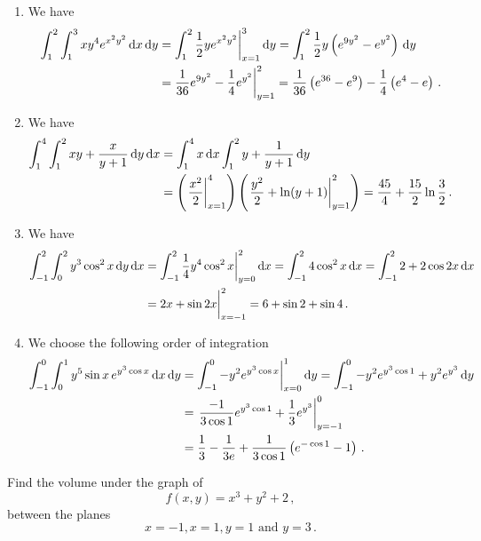 \begin{solution}
\begin{enumerate}
\item
We have
\begin{align*}
\int_1^2 \int_1^3 xy^4 e^{x^2y^2} \,\mathrm{d} x \,\mathrm{d} y
&= \int_1^2 \frac 12 y e^{x^2y^2} \bigg|_{x=1}^3 \,\mathrm{d} y
= \int_1^2 \frac 12 y \left( e^{9y^2} - e^{y^2}\right) \,\mathrm{d} y \\
&= \frac{1}{36} e^{9y^2} - \frac{1}{4} e^{y^2} \bigg|_{y=1}^2
= \frac{1}{36} \left(e^{36} - e^9\right) - \frac{1}{4} \left(e^4 - e\right)\,.
\end{align*}
\item We have
\begin{align*}
\int_1^4 \int_1^2 xy + \frac{x}{y+1} \,\mathrm{d} y \,\mathrm{d} x
&= \int_1^4 x \,\mathrm{d} x \int_1^2 y + \frac{1}{y+1} \,\mathrm{d} y \\
&= \left(\left. \frac{x^2}2 \right|_{x=1}^4 \right) \left(\left. \frac{y^2}2 + \ln(y+1) \right|_{y=1}^2 \right)
= \frac {45}4 + \frac{15}2 \ln \frac 32\,.
\end{align*}
\item
We have
\begin{align*}
\int_{-1}^2 \int_0^2 y^3 \cos^2 x \,\mathrm{d} y \,\mathrm{d} x &=
\int_{-1}^2 \frac 14 y^4 \cos^2 x \bigg|_{y=0}^2 \,\mathrm{d} x
= \int_{-1}^2 4 \cos^2 x \,\mathrm{d} x 
= \int_{-1}^2 2 + 2\cos 2x \,\mathrm{d} x \\
&= 2x + \sin 2x \bigg|_{x={-1}}^2 = 6 + \sin 2 + \sin 4\,.
\end{align*}
\item
We choose the following order of integration
\begin{align*}
\int_{-1}^0 \int_0^1 y^5 \sin x\, e^{y^3 \cos x} \,\mathrm{d} x \,\mathrm{d} y
&= \int_{-1}^0 -y^2 e^{y^3 \cos x} \bigg|_{x=0}^1 \,\mathrm{d} y
= \int_{-1}^0 -y^2 e^{y^3 \cos 1} + y^2 e^{y^3}\,\mathrm{d} y \\
&= \left.\frac{-1}{3\cos 1} e^{y^3 \cos 1} + \frac 13 e^{y^3} \right|_{y=-1}^0 \\
&= \frac 13 - \frac 1{3e} + \frac{1}{3\cos 1}\left(e^{-\cos 1} - 1\right)\,.
\end{align*}
\end{enumerate}
\end{solution}

\begin{question}
Find the volume under the graph of
\[
f(x,y) = x^3 + y^2 + 2\,,
\]
between the planes
\[
x=-1, x=1, y=1 \text{ and } y=3\,.
\]
\end{question}


